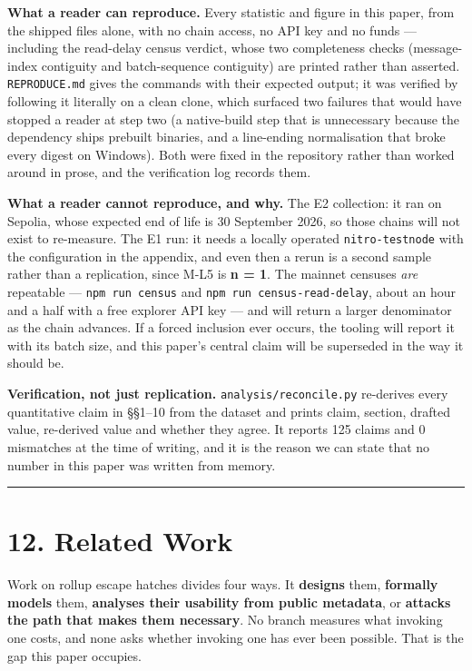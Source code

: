 \documentclass[conference]{IEEEtran}
\renewcommand{\_}{\textunderscore\allowbreak}
\begin{document}
\textbf{What a reader can reproduce.} Every statistic and figure in this
paper, from the shipped files alone, with no chain access, no API key
and no funds --- including the read-delay census verdict, whose two
completeness checks (message-index contiguity and batch-sequence
contiguity) are printed rather than asserted. \texttt{REPRODUCE.md}
gives the commands with their expected output; it was verified by
following it literally on a clean clone, which surfaced two failures
that would have stopped a reader at step two (a native-build step that
is unnecessary because the dependency ships prebuilt binaries, and a
line-ending normalisation that broke every digest on Windows). Both were
fixed in the repository rather than worked around in prose, and the
verification log records them.

\textbf{What a reader cannot reproduce, and why.} The E2 collection: it
ran on Sepolia, whose expected end of life is 30 September 2026, so
those chains will not exist to re-measure. The E1 run: it needs a
locally operated \texttt{nitro-testnode} with the configuration in the
appendix, and even then a rerun is a second sample rather than a
replication, since M-L5 is \textbf{n = 1}. The mainnet censuses
\emph{are} repeatable --- \texttt{npm\ run\ census} and
\texttt{npm\ run\ census-read-delay}, about an hour and a half with a
free explorer API key --- and will return a larger denominator as the
chain advances. If a forced inclusion ever occurs, the tooling will
report it with its batch size, and this paper's central claim will be
superseded in the way it should be.

\textbf{Verification, not just replication.}
\texttt{analysis/reconcile.py} re-derives every quantitative claim in
§§1--10 from the dataset and prints claim, section, drafted value,
re-derived value and whether they agree. It reports 125 claims and 0
mismatches at the time of writing, and it is the reason we can state
that no number in this paper was written from memory.

\begin{center}\rule{0.5\linewidth}{0.5pt}\end{center}

\section{12. Related Work}\label{related-work}

Work on rollup escape hatches divides four ways. It \textbf{designs}
them, \textbf{formally models} them, \textbf{analyses their usability
from public metadata}, or \textbf{attacks the path that makes them
necessary}. No branch measures what invoking one costs, and none asks
whether invoking one has ever been possible. That is the gap this paper
occupies.
\end{document}
